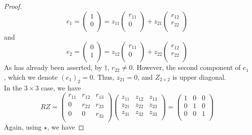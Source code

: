 \documentclass{article}
\begin{document}
\begin{proof}
    \[e_1 =
        \begin{pmatrix}
            1 \\
            0 \\
        \end{pmatrix} 
        =
        z_{11}\begin{pmatrix}
            r_{11} \\
            0 \\
        \end{pmatrix}
        +
        z_{21} \begin{pmatrix}
            r_{12} \\
            r_{22} \\
        \end{pmatrix}
    \]
    and 
    \[e_2 =
        \begin{pmatrix}
            0 \\
            1 \\
        \end{pmatrix} 
        =
        z_{12}\begin{pmatrix}
            r_{11} \\
            0 \\
        \end{pmatrix}
        +
        z_{22} \begin{pmatrix}
            r_{12} \\
            r_{22} \\
        \end{pmatrix}
    \]
    As has already been asserted, by $\dagger$, $r_{22} \neq 0$. However, the second component of $e_1$, which we denote $(e_1)_2 = 0$. Thus, $z_{21} = 0$, and $Z_{2 \times 2}$ is upper diagonal.\\

    In the $3 \times 3$ case, we have
    \[
        RZ = \begin{pmatrix}
            r_{11} & r_{12} & r_{13} \\
            0 & r_{22} & r_{23} \\
            0 & 0 & r_{33}   \\
        \end{pmatrix} 
        \begin{pmatrix}
            z_{11} & z_{12} & z_{13} \\
            z_{21} & z_{22} & z_{23} \\
            z_{31} & z_{32} & z_{33}   \\
        \end{pmatrix} 
        =
        \begin{pmatrix}
            1 & 0 & 0 \\
            0 & 1 & 0 \\
            0 & 0 & 1   \\
        \end{pmatrix} 
    \]
        Again, using $\star$, we have


\end{proof}
\end{document}
